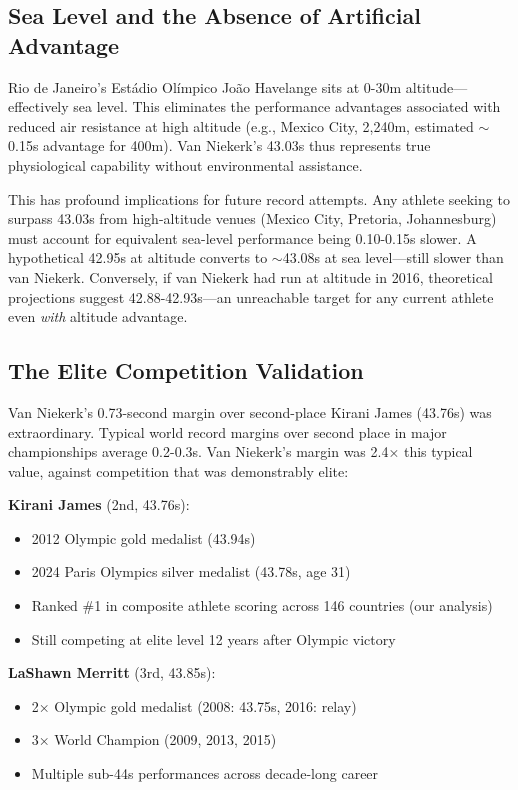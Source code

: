 \documentclass[twocolumn,10pt]{article}
\begin{document}
\subsection{Sea Level and the Absence of Artificial Advantage}

Rio de Janeiro's Estádio Olímpico João Havelange sits at 0-30m altitude—effectively sea level. This eliminates the performance advantages associated with reduced air resistance at high altitude (e.g., Mexico City, 2,240m, estimated $\sim$0.15s advantage for 400m). Van Niekerk's 43.03s thus represents true physiological capability without environmental assistance.

This has profound implications for future record attempts. Any athlete seeking to surpass 43.03s from high-altitude venues (Mexico City, Pretoria, Johannesburg) must account for equivalent sea-level performance being 0.10-0.15s slower. A hypothetical 42.95s at altitude converts to $\sim$43.08s at sea level—still slower than van Niekerk. Conversely, if van Niekerk had run at altitude in 2016, theoretical projections suggest 42.88-42.93s—an unreachable target for any current athlete even \textit{with} altitude advantage.

\subsection{The Elite Competition Validation}

Van Niekerk's 0.73-second margin over second-place Kirani James (43.76s) was extraordinary. Typical world record margins over second place in major championships average 0.2-0.3s. Van Niekerk's margin was 2.4× this typical value, against competition that was demonstrably elite:

\textbf{Kirani James} (2nd, 43.76s):
\begin{itemize}
    \item 2012 Olympic gold medalist (43.94s)
    \item 2024 Paris Olympics silver medalist (43.78s, age 31)
    \item Ranked \#1 in composite athlete scoring across 146 countries (our analysis)
    \item Still competing at elite level 12 years after Olympic victory
\end{itemize}

\textbf{LaShawn Merritt} (3rd, 43.85s):
\begin{itemize}
    \item 2× Olympic gold medalist (2008: 43.75s, 2016: relay)
    \item 3× World Champion (2009, 2013, 2015)
    \item Multiple sub-44s performances across decade-long career
\end{itemize}
\end{document}
